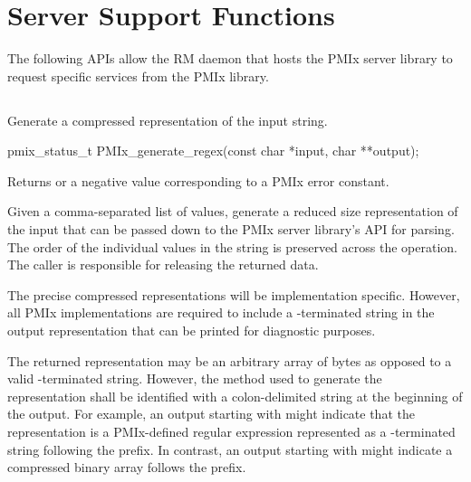 \section{Server Support Functions}

The following \acp{API} allow the \ac{RM} daemon that hosts the \ac{PMIx} server library to request specific services from the \ac{PMIx} library.

\subsection{}

\summary

Generate a compressed representation of the input string.

\format

\cspecificstart
\begin{codepar}
pmix_status_t
PMIx_generate_regex(const char *input, char **output);
\end{codepar}
\cspecificend

\begin{arglist}
\end{arglist}

Returns  or a negative value corresponding to a PMIx error constant.

\descr

Given a comma-separated list of  values, generate a reduced size representation of the input that can be passed down to the \ac{PMIx} server library's  \ac{API} for parsing. The order of the individual values in the  string is preserved across the operation. The caller is responsible for releasing the returned data.

The precise compressed representations will be implementation specific. However, all \ac{PMIx} implementations are required to include a -terminated string in the output representation that can be printed for diagnostic purposes.

\advicermstart
The returned representation may be an arbitrary array of bytes as opposed to a valid -terminated string. However, the method used to generate the representation shall be identified with a colon-delimited string at the beginning of the output. For example, an output starting with  might indicate that the representation is a \ac{PMIx}-defined regular expression represented as a -terminated string following the  prefix. In contrast, an output starting with  might indicate a compressed binary array follows the prefix.

